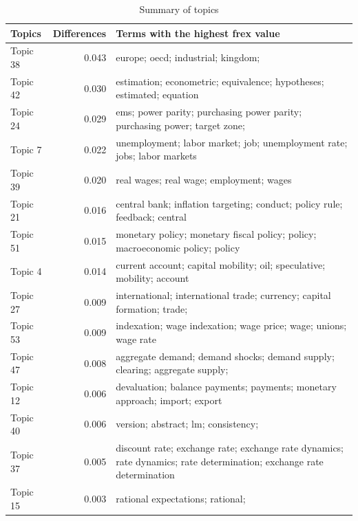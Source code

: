 \documentclass[]{elsarticle} %
\begin{document}
\begin{table}[!h]

\caption{\label{tab:summary-topics}Summary of topics}
\centering
\fontsize{5}{7}\selectfont
\begin{threeparttable}
\begin{tabular}[t]{lrl}
\toprule
Topics & Differences & Terms with the highest frex value\\
\midrule
Topic 38 & 0.043 & europe; oecd; industrial; kingdom;
\cellcolor{gray!6}{european; countries}\\
Topic 42 & 0.030 & estimation; econometric; equivalence;
hypotheses; estimated; equation\\
Topic 24 & 0.029 & ems; power parity; purchasing power
parity; purchasing power; target zone;
\cellcolor{gray!6}{exchange rate regime; rate regime}\\
Topic 7 & 0.022 & unemployment; labor market; job;
unemployment rate; jobs; labor markets\\
Topic 39 & 0.020 & real wages; real wage; employment; wages
\cellcolor{gray!6}{prices; nominal wage; wages}\\
\addlinespace
Topic 21 & 0.016 & central bank; inflation targeting;
conduct; policy rule; feedback; central\\
Topic 51 & 0.015 & monetary policy; monetary fiscal policy;
policy; macroeconomic policy; policy
\cellcolor{gray!6}{makers; policy coordination}\\
Topic 4 & 0.014 & current account; capital mobility; oil;
speculative; mobility; account\\
Topic 27 & 0.009 & international; international trade;
currency; capital formation; trade;
\cellcolor{gray!6}{country}\\
Topic 53 & 0.009 & indexation; wage indexation; wage price;
wage; unions; wage rate\\
\addlinespace
Topic 47 & 0.008 & aggregate demand; demand shocks; demand
supply; clearing; aggregate supply;
\cellcolor{gray!6}{supply}\\
Topic 12 & 0.006 & devaluation; balance payments; payments;
monetary approach; import; export\\
Topic 40 & 0.006 & version; abstract; lm; consistency;
\cellcolor{gray!6}{index; call}\\
Topic 37 & 0.005 & discount rate; exchange rate;
exchange rate dynamics; rate dynamics;
rate determination; exchange rate
determination\\
Topic 15 & 0.003 & rational expectations; rational;

\end{tabular}
\end{threeparttable}
\end{table}
\end{document}
